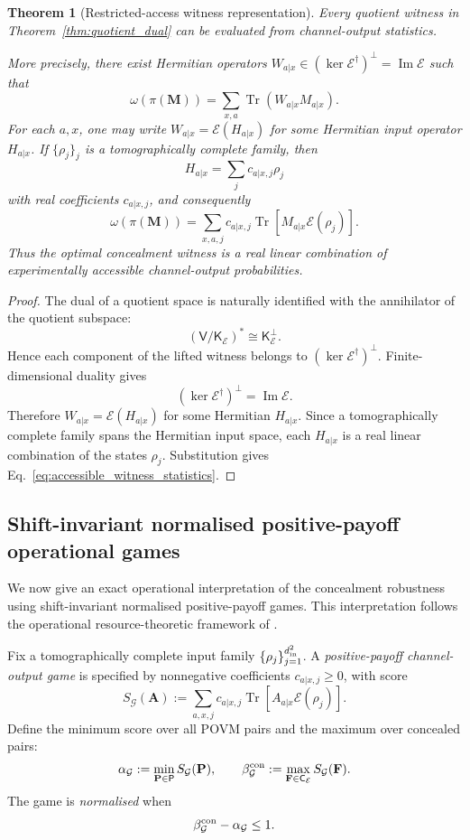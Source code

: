 \documentclass[
aps,pra,twocolumn,10pt,
superscriptaddress,longbibliography,floatfix
]{revtex4-2}
\DeclareMathOperator{\Tr}{Tr}
\DeclareMathOperator{\im}{Im}
\newtheorem{theorem}{Theorem}[section]
\begin{document}
\begin{theorem}[Restricted-access witness representation]
\label{thm:accessible_witness}
Every quotient witness in Theorem~\ref{thm:quotient_dual} can be evaluated from channel-output statistics.

More precisely, there exist Hermitian operators $W_{a|x}\in(\ker\mathcal E^\dagger)^\perp=\im\mathcal E$ such that
\[
\omega(\pi(\mathbf M))
=
\sum_{x,a}\Tr(W_{a|x}M_{a|x}).
\]
For each $a,x$, one may write $W_{a|x}=\mathcal E(H_{a|x})$ for some Hermitian input operator $H_{a|x}$. If $\{\rho_j\}_j$ is a tomographically complete family, then
\[
H_{a|x}
=
\sum_j c_{a|x,j}\rho_j
\]
with real coefficients $c_{a|x,j}$, and consequently
\begin{equation}
\label{eq:accessible_witness_statistics}
\omega(\pi(\mathbf M))
=
\sum_{x,a,j}
c_{a|x,j}
\Tr\!\left[M_{a|x}\mathcal E(\rho_j)\right].
\end{equation}
Thus the optimal concealment witness is a real linear combination of experimentally accessible channel-output probabilities.
\end{theorem}

\begin{proof}
The dual of a quotient space is naturally identified with the annihilator of the quotient subspace:
\[
(\mathsf V/\mathsf K_{\mathcal E})^*
\cong
\mathsf K_{\mathcal E}^{\perp}.
\]
Hence each component of the lifted witness belongs to $(\ker\mathcal E^\dagger)^\perp$. Finite-dimensional duality gives
\[
(\ker\mathcal E^\dagger)^\perp=\im\mathcal E.
\]
Therefore $W_{a|x}=\mathcal E(H_{a|x})$ for some Hermitian $H_{a|x}$. Since a tomographically complete family spans the Hermitian input space, each $H_{a|x}$ is a real linear combination of the states $\rho_j$. Substitution gives Eq.~\eqref{eq:accessible_witness_statistics}.
\end{proof}

\subsection{Shift-invariant normalised positive-payoff operational games}

We now give an exact operational interpretation of the concealment robustness using shift-invariant normalised positive-payoff games. This interpretation follows the operational resource-theoretic framework of \cite{Uola2019,Skrzypczyk2019,Takagi2019}.

Fix a tomographically complete input family $\{\rho_j\}_{j=1}^{d_{\rm in}^2}$. A \emph{positive-payoff channel-output game} is specified by nonnegative coefficients $c_{a|x,j}\ge0$, with score
\begin{equation}
S_{\mathcal G}(\mathbf A)
:=
\sum_{a,x,j}
c_{a|x,j}
\Tr\!\left[
A_{a|x}\mathcal E(\rho_j)
\right].
\label{eq:positive_channel_output_game_score}
\end{equation}
Define the minimum score over all POVM pairs and the maximum over concealed pairs:
\[
\alpha_{\mathcal G}
:=
\min_{\mathbf P\in\mathsf P}
S_{\mathcal G}(\mathbf P),
\qquad
\beta_{\mathcal G}^{\rm con}
:=
\max_{\mathbf F\in\mathsf C_{\mathcal E}}
S_{\mathcal G}(\mathbf F).
\]
The game is \emph{normalised} when
\[
\beta_{\mathcal G}^{\rm con}-\alpha_{\mathcal G}\le1.
\]
\end{document}
